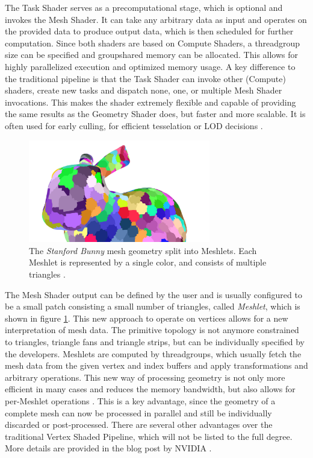 \noindent
The Task Shader serves as a precomputational stage, which is optional and invokes the Mesh Shader.
It can take any arbitrary data as input and operates on the provided data to produce output data, which is then 
scheduled for further computation. Since both shaders are based on Compute Shaders, a threadgroup size can be 
specified  and groupshared memory can be allocated. This allows for highly parallelized execution and optimized 
memory usage. A key difference to the traditional pipeline is that the Task Shader can invoke other (Compute) shaders, 
create new tasks and dispatch none, one, or multiple Mesh Shader invocations. This makes the shader extremely flexible 
and capable of providing the same results as the Geometry Shader does, but faster and more scalable. It is often used 
for early culling, for efficient tesselation or \ac{LOD} decisions \cite{Kubisch2018}. \\

\begin{figure}[h]
    \centering
    \includegraphics[width=300px]{images/graphics/bunny-meshlet.jpg}
    \caption{The \emph{Stanford Bunny} mesh geometry split into Meshlets. Each Meshlet is represented by a single color, 
    and consists of multiple triangles \cite{Oberberger2024}.}
    \label{fig:bunny-meshlet}
\end{figure}

\noindent
The Mesh Shader output can be defined by the user and is usually configured to be a small patch consisting a small 
number of triangles, called \emph{Meshlet}, which is shown in figure \ref{fig:bunny-meshlet}. This new approach 
to operate on vertices allows for a new interpretation of mesh data. The primitive topology is not anymore constrained 
to triangles, triangle fans and triangle strips, but can be individually specified by the developers.
Meshlets are computed by threadgroups, which usually fetch the mesh data from the given vertex and index buffers and 
apply transformations and arbitrary operations. This new way of processing geometry is not only more efficient in many 
cases and reduces the memory bandwidth, but also allows for per-Meshlet operations \cite{Kubisch2020}. This is a key 
advantage, since the geometry of a complete mesh can now be processed in parallel and still be individually discarded 
or post-processed. There are several other advantages over the traditional Vertex Shaded Pipeline, which will not be 
listed to the full degree. More details are provided in the blog post by NVIDIA \cite{Kubisch2020}.\\


